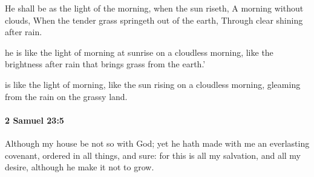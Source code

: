 			\begin{versebox}
					\item[BHS] 
					\item[ASV] He shall be as the light of the morning, when the sun riseth, A morning without clouds, When the tender grass springeth out of the earth, Through clear shining after rain.
					\item[NIV] he is like the light of morning at sunrise on a cloudless morning, like the brightness after rain that brings grass from the earth.’
					\item[NRSV] is like the light of morning, like the sun rising on a cloudless morning, gleaming from the rain on the grassy land.
			\end{versebox}

		\paragraph{2 Samuel 23:5} %
			\label{2SAMUEL-23-5}

			Although my house be not so with God; yet he hath made with me an everlasting covenant, ordered in all things, and sure: for this is all my salvation, and all my desire, although he make it not to grow.

